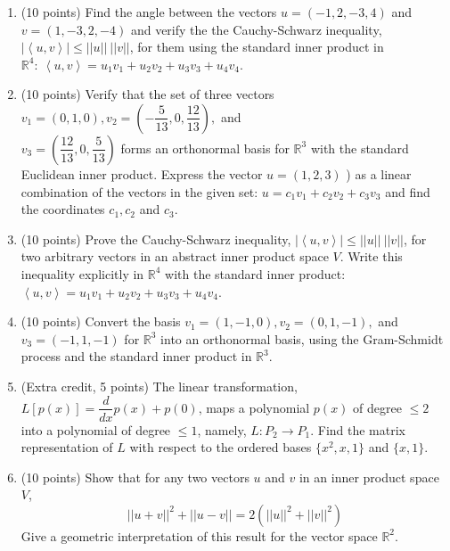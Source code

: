 \documentclass[fleqn]{article}
\begin{document}
  \begin{enumerate}
    \item (10 points) Find the angle between the vectors $u=(-1, 2, -3, 4)$ and $v=(1, -3, 2, -4)$ and 
    verify the the Cauchy-Schwarz inequality, $|\left\langle u, v\right\rangle| \leq ||u|| ~ ||v||$, for 
    them using the standard inner product in $\mathbb{R}^4: ~ \left\langle u,v\right\rangle =u_1 v_1+u_2 v_2+u_3 v_3+u_4 v_4$.


    \item (10 points) Verify that the set of three vectors $v_1=(0, 1, 0), v_2=(-\dfrac{5}{13}, 0, \dfrac{12}{13}),$ and \\
    $v_3=(\dfrac{12}{13}, 0, \dfrac{5}{13})$ forms an orthonormal basis for $\mathbb{R}^3$ with the standard Euclidean inner
    product. Express the vector $u=(1, 2, 3)$ ) as a linear combination of the vectors in the given set: 
    $u=c_1 v_1+c_2 v_2+c_3 v_3$ and find the coordinates $c_1, c_2$ and $c_3$.

    \item (10 points) Prove the Cauchy-Schwarz inequality, $|\left\langle u, v\right\rangle| \leq ||u|| ~ ||v||$,
    for two arbitrary vectors in an abstract inner product space $V$. Write this inequality explicitly in $\mathbb{R}^4$
    with the standard inner product: $\left\langle u,v\right\rangle =u_1 v_1+u_2 v_2+u_3 v_3+u_4 v_4$.


    \item (10 points) Convert the basis $v_1=(1, -1, 0), v_2=(0, 1, -1),$ and $v_3=(-1, 1, -1)$ for $\mathbb{R}^3$ into
    an orthonormal basis, using the Gram-Schmidt process and the standard inner product in $\mathbb{R}^3$.


    \item (Extra credit, 5 points) The linear transformation, $L \left[p(x)\right]=\dfrac{d}{dx}p(x)+p(0)$, maps 
    a polynomial $p(x)$ of degree $\leq 2$  into a polynomial of degree $\leq 1$, namely, $L: P_2 \rightarrow P_1$.
    Find the matrix representation of $L$ with respect to the ordered bases $\{ x^2, x, 1\}$ and $\{ x, 1\}$.

    \item (10 points) Show that for any two vectors $u$ and $v$ in an inner product space $V$,
    $$||u+v||^2+||u-v||=2\left(||u||^2+||v||^2\right)$$
    Give a geometric interpretation of this result for the vector space $\mathbb{R}^2$.

  \end{enumerate}
\end{document}
